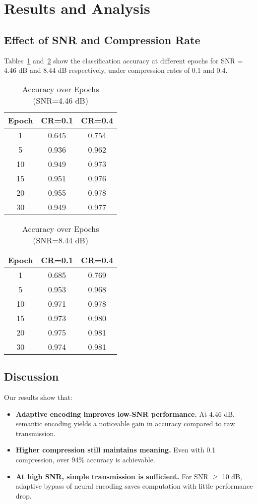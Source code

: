\documentclass[conference]{IEEEtran}
\begin{document}
\section{Results and Analysis}

\subsection{Effect of SNR and Compression Rate}
Tables~\ref{tab:acc1} and~\ref{tab:acc2} show the classification accuracy at different epochs for SNR = 4.46 dB and 8.44 dB respectively, under compression rates of 0.1 and 0.4.

\begin{table}[htbp]
\caption{Accuracy over Epochs (SNR=4.46 dB)}
\label{tab:acc1}
\centering
\begin{tabular}{@{}c|cc@{}}
\toprule
Epoch & CR=0.1 & CR=0.4 \\
\midrule
1 & 0.645 & 0.754 \\
5 & 0.936 & 0.962 \\
10 & 0.949 & 0.973 \\
15 & 0.951 & 0.976 \\
20 & 0.955 & 0.978 \\
30 & 0.949 & 0.977 \\
\bottomrule
\end{tabular}
\end{table}

\begin{table}[htbp]
\caption{Accuracy over Epochs (SNR=8.44 dB)}
\label{tab:acc2}
\centering
\begin{tabular}{@{}c|cc@{}}
\toprule
Epoch & CR=0.1 & CR=0.4 \\
\midrule
1 & 0.685 & 0.769 \\
5 & 0.953 & 0.968 \\
10 & 0.971 & 0.978 \\
15 & 0.973 & 0.980 \\
20 & 0.975 & 0.981 \\
30 & 0.974 & 0.981 \\
\bottomrule
\end{tabular}
\end{table}

\subsection{Discussion}
Our results show that:
\begin{itemize}
    \item \textbf{Adaptive encoding improves low-SNR performance.} At 4.46 dB, semantic encoding yields a noticeable gain in accuracy compared to raw transmission.
    \item \textbf{Higher compression still maintains meaning.} Even with 0.1 compression, over 94\% accuracy is achievable.
    \item \textbf{At high SNR, simple transmission is sufficient.} For SNR $\geq$ 10 dB, adaptive bypass of neural encoding saves computation with little performance drop.
\end{itemize}
\end{document}
